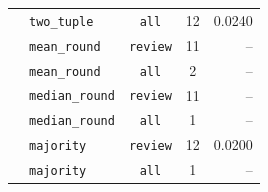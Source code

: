 \begin{table}[htbp]
{\begin{tabular}{llccr}
   & \texttt{two\_tuple} & \texttt{all} & 12 & 0.0240 \\
   & \texttt{mean\_round} & \texttt{review} & 11 & -- \\
   & \texttt{mean\_round} & \texttt{all} & 2 & -- \\
   & \texttt{median\_round} & \texttt{review} & 11 & -- \\
   & \texttt{median\_round} & \texttt{all} & 1 & -- \\
   & \texttt{majority} & \texttt{review} & 12 & 0.0200 \\
   & \texttt{majority} & \texttt{all} & 1 & -- \\
\bottomrule
\end{tabular}%
}
\end{table}

